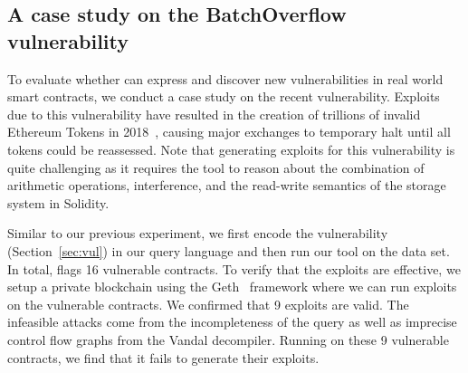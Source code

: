 \subsection{A case study on the BatchOverflow vulnerability}\label{sec:case}

To evaluate whether \toolname can express and discover new vulnerabilities in real world
smart contracts, we conduct a case study on the recent \batchoverflow
vulnerability. Exploits
due to this vulnerability have resulted in the creation of trillions of invalid
Ethereum Tokens in 2018~\cite{batch-news}, causing major exchanges to temporary
halt until all tokens could be reassessed. Note that generating exploits for
this vulnerability is quite challenging as it requires the tool to reason about
the combination of arithmetic operations, interference, and the read-write
semantics of the storage system in Solidity. 

Similar to our previous experiment, we first encode the \batchoverflow vulnerability
(Section~\ref{sec:vul}) in our query language and then run our tool on the 
\etherscan data set. In total, \toolname flags 16 vulnerable
contracts. To verify that the exploits are effective, we setup a private
blockchain using the Geth~\cite{geth} framework where we can run exploits on the
vulnerable contracts. We confirmed that 9 exploits are valid. 
The infeasible attacks come from the incompleteness of the query 
as well as imprecise control flow graphs from the Vandal decompiler. 
Running \teether on these 9 vulnerable contracts, we find 
that it fails to generate their exploits.

